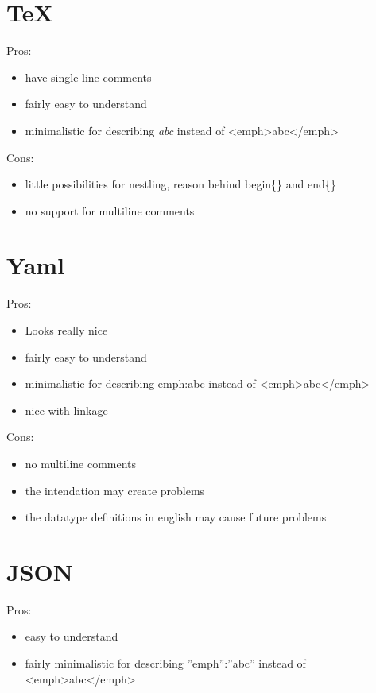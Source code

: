 \documentclass{book}
\begin{document}
	\section{TeX}
	
	Pros:
	
	\begin{itemize}
		\item have single-line comments
		\item fairly easy to understand
		\item minimalistic for describing \emph{abc} instead of <emph>abc</emph>
	\end{itemize}
	
	Cons:
	
	\begin{itemize}
		\item little possibilities for nestling, reason behind begin\{\} and end\{\}
		\item no support for multiline comments
	\end{itemize}
	
	\section{Yaml}
	
	Pros:
	
	\begin{itemize}
		\item Looks really nice
		\item fairly easy to understand
		\item minimalistic for describing emph:abc instead of <emph>abc</emph>
		\item nice with linkage
	\end{itemize}
	
	Cons:
	
	\begin{itemize}
		\item no multiline comments
		\item the intendation may create problems
		\item the datatype definitions in english may cause future problems
	\end{itemize}
	
	\section{JSON}
	
	Pros:
	
	\begin{itemize}
		\item easy to understand
		\item fairly minimalistic for describing ''emph'':''abc'' instead of <emph>abc</emph>
	\end{itemize}
	
\end{document}
